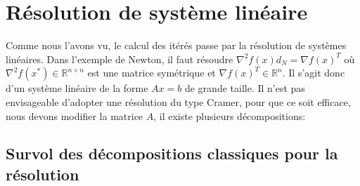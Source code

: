


\section{R\'esolution de syst\`eme lin\'eaire}
{\co Comme nous l'avons vu, le calcul des it\'er\'es passe par la r\'esolution de syst\`emes lin\'eaires.} Dans l'exemple de Newton,
 il faut r\'esoudre $\nabla^2 f(x)d_N=\nabla f(x)^T$ o\`u $\nabla^2 f(x^*)\in \mathbb{R}^{n\times n}$
 est une matrice sym\'etrique et $\nabla f(x)^T \in \mathbb{R}^n$.
Il s'agit donc d'un syst\`eme lin\'eaire de la forme $Ax=b$ de grande taille. Il n'est pas envisageable 
d'adopter une r\'esolution du type Cramer, pour que ce soit efficace, nous devons
 modifier la matrice $A$, il existe plusieurs d\'ecompositions:
{\co 
\subsection{Survol des d\'ecompositions classiques pour la r\'esolution}}
